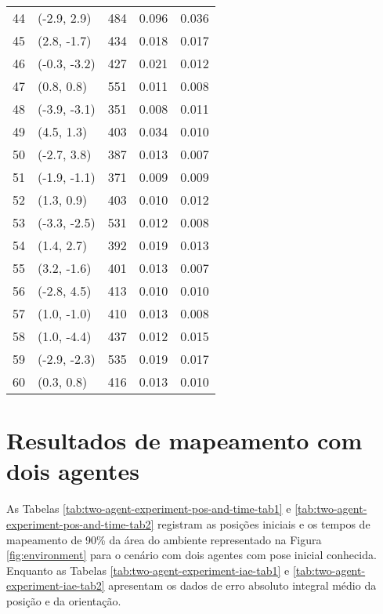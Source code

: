 \begin{table}[]
\begin{tabularx}{\textwidth}{@{}YYYYY@{}}
44 &(-2.9, 2.9)&       484& 0.096&         0.036 \\
45 &(2.8, -1.7)&       434& 0.018&         0.017 \\
46 &(-0.3, -3.2)&       427& 0.021&         0.012 \\
47 &(0.8, 0.8)&       551& 0.011&         0.008 \\
48 &(-3.9, -3.1)&       351& 0.008&         0.011 \\
49 &(4.5, 1.3)&       403& 0.034&         0.010 \\
50 &(-2.7, 3.8)&       387& 0.013&         0.007 \\
51 &(-1.9, -1.1)&       371& 0.009&         0.009 \\
52 &(1.3, 0.9)&       403& 0.010&         0.012 \\
53 &(-3.3, -2.5)&       531& 0.012&         0.008 \\
54 &(1.4, 2.7)&       392& 0.019&         0.013 \\
55 &(3.2, -1.6)&       401& 0.013&         0.007 \\
56 &(-2.8, 4.5)&       413& 0.010&         0.010 \\
57 &(1.0, -1.0)&       410& 0.013&         0.008 \\
58 &(1.0, -4.4)&       437& 0.012&         0.015 \\
59 &(-2.9, -2.3)&       535& 0.019&         0.017 \\
60 &(0.3, 0.8)&       416& 0.013&         0.010 
\\ \hline
\end{tabularx}
  
\end{table}

\clearpage

\section{Resultados de mapeamento com dois agentes}
\label{app:two-agent-data}

As Tabelas \ref{tab:two-agent-experiment-pos-and-time-tab1} e \ref{tab:two-agent-experiment-pos-and-time-tab2} registram as posições 
iniciais e os tempos de mapeamento de 90\% da área do ambiente 
representado na Figura \ref{fig:environment} para o cenário com dois 
agentes com pose inicial conhecida. Enquanto as Tabelas \ref{tab:two-agent-experiment-iae-tab1} e \ref{tab:two-agent-experiment-iae-tab2} apresentam os dados de erro absoluto 
integral médio da posição e da orientação.


